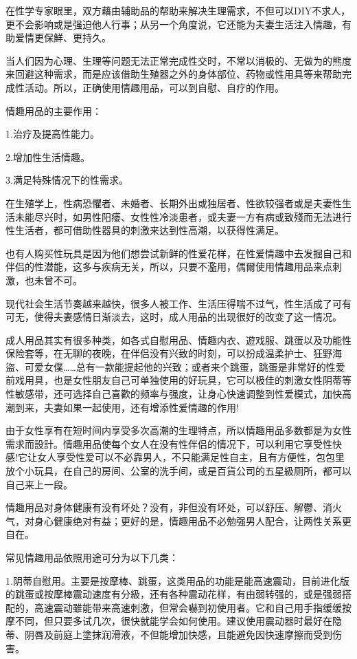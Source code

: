 \documentclass[12pt,UTF8]{ctexbook}
\begin{document}
在性学专家眼里，双方藉由辅助品的帮助来解决生理需求，不但可以DIY不求人，更不会影响或是强迫他人行事；从另一个角度说，它还能为夫妻生活注入情趣，有助爱情更保鮮、更持久。

当人们因为心理、生理等问题无法正常完成性交时，不常以消极的、无做为的熊度来回避这种需求，而是应该借助生殖器之外的身体部位、药物或性用具等来帮助完成性活动。所以，正确使用情趣用品，可以到自慰、自疗的作用。

情趣用品的主要作用：

1.治疗及提高性能力。

2.增加性生活情趣。

3.满足特殊情况下的性需求。

在生殖学上，性病恐懼者、未婚者、长期外出或独居者、性欲较强者或是夫妻性生活未能尽兴时，如男性阳痿、女性性冷淡患者，或夫妻一方有病或致殘而无法进行性生活者，都可借助性器具的刺激来达到性高潮，以获得性满足。

也有人购买性玩具是因为他们想尝试新鲜的性爱花样，在性爱情趣中去发掘自己和伴侣的性潜能，这多与疾病无关，所以，只要不濫用，偶爾使用情趣用品来点刺激，也未曾不可。

现代社会生活节奏越来越快，很多人被工作、生活压得喘不过气，性生活成了可有可无，使得夫妻感情日渐淡去，这时，成人用品的出现很好的改变了这一情况。

成人用品其实有很多种类，如各式自慰用品、情趣内衣、遊戏服、跳蛋以及功能性保险套等，在无聊的夜晚，在伴侣没有兴致的时刻，可以扮成温柔护士、狂野海盜、可爱女僕……总有一款能提起他的兴致；或者来个跳蛋，跳蛋是非常好的性爱前戏用具，也是女性朋友自己可单独使用的好玩具，它可以极佳的刺激女性阴蒂等性敏感带，还可选择自己喜歡的频率与强度，让身心快速调整到性爱模式，加快高潮到来，夫妻如果一起使用，还有增添性爱情趣的作用!

由于女性享有在短时间内享受多次高潮的生理特点，所以情趣用品多数都是为女性需求而設計。情趣用品使每个女人在没有性伴侣的情况下，可以利用它享受性快感!它让女人享受性爱可以不必靠男人，不只能满足性自主，且有方便性，包包里放个小玩具，在自己的房间、公室的洗手间，或是百貨公司的五星級厕所，都可以自己来上一段。

情趣用品对身体健康有没有坏处？没有，非但没有坏处，可以舒压、解鬱、消火气，对身心健康绝对有益；更好的是，情趣用品不必勉强男人配合，让两性关系更自在。

常见情趣用品依照用途可分为以下几类：

1.阴蒂自慰用。主要是按摩棒、跳蛋，这类用品的功能是能高速震动，目前进化版的跳蛋或按摩棒震动速度有分級，还有各种震动花样，有由弱转强的，或是强弱搭配的，高速震动雖能带来高速刺激，但常会嚇到初使用者。它和自己用手指缓缓按摩不同，但只要多试几次，很快就能学会如何使用。建议使用震动器时最好在隐蒂、阴唇及前庭上塗抹润滑液，不但能增加快感，且能避免因快速摩擦而受到伤害。
\end{document}
